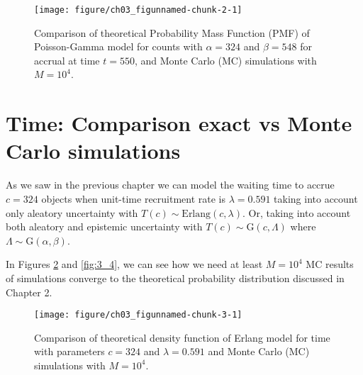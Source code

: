 \begin{figure}
\begin{knitrout}
\color{fgcolor}
\texttt{[image: figure/ch03\_figunnamed-chunk-2-1]} 
\end{knitrout}
\caption{Comparison of theoretical Probability Mass Function (PMF) of Poisson-Gamma model for counts with $\alpha = 324$ and $\beta = 548$ for accrual at time $t=550$, and Monte Carlo (MC) simulations with $M=10^4$.}
\label{fig:3_2}
\end{figure}



\section{Time: Comparison exact vs Monte Carlo simulations}


As we saw in the previous chapter we can model the waiting time to accrue $c = 324$ objects when unit-time recruitment rate is $\lambda = 0.591$ taking into account only aleatory uncertainty with $T(c)\sim \textrm{Erlang}(c,\lambda)$. Or, taking into account both aleatory and epistemic uncertainty with $T(c)\sim\textrm{G}(c, \Lambda)$ where $\Lambda\sim \textrm{G}(\alpha,\beta)$.


In Figures \ref{fig:3_3} and \ref{fig:3_4}, we can see how we need at least $M=10^4$ MC results of simulations converge to the theoretical probability distribution discussed in Chapter 2.

% 
% 

\begin{figure}
\begin{knitrout}
\color{fgcolor}
\texttt{[image: figure/ch03\_figunnamed-chunk-3-1]} 
\end{knitrout}
\caption{Comparison of theoretical density function of Erlang model for time with parameters $c = 324$ and $\lambda = 0.591$ and Monte Carlo (MC) simulations with $M=10^4$.}
\label{fig:3_3}
\end{figure}


